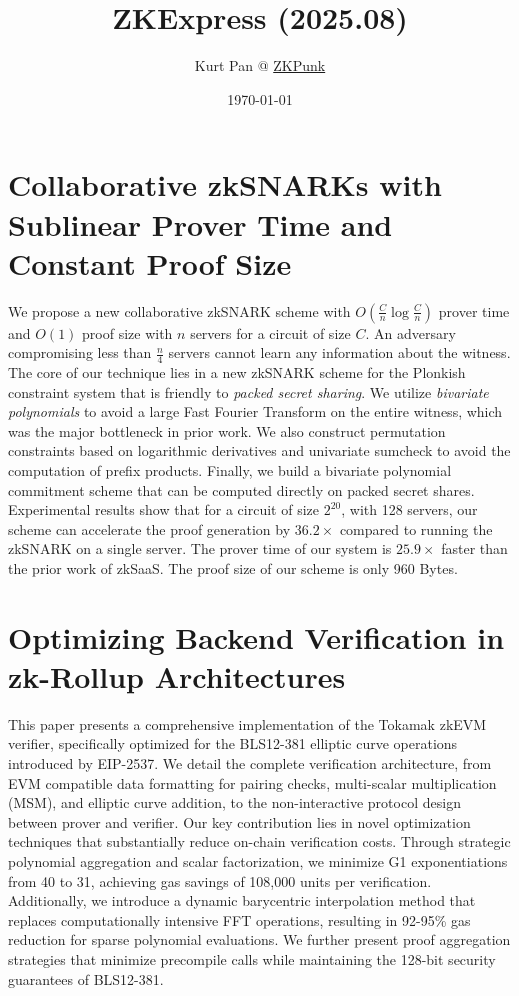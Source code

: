 \documentclass[11pt]{article}
\theoremstyle{definition}
\theoremstyle{remark}
\theoremstyle{plain}
\begin{document}
\title{ZKExpress (2025.08)}
\author{Kurt Pan @ \href{https://zkpunk.pro}{ZKPunk}}
\date{\today}
\maketitle
\tableofcontents

\section{\cite{cryptoeprint:2025/1388} Collaborative zkSNARKs with Sublinear Prover Time and Constant Proof Size}
We propose a new collaborative zkSNARK scheme with $O\left(\frac{C}{n} \log \frac{C}{n}\right)$ prover time and $O(1)$ proof size with $n$ servers for a circuit of size $C$. 
An adversary compromising less than $\frac{n}{4}$ servers cannot learn any information about the witness. 
The core of our technique lies in a new zkSNARK scheme for the Plonkish constraint system that is friendly to \emph{packed secret sharing}. We utilize \emph{bivariate polynomials} to avoid a large Fast Fourier Transform on the entire witness, which was the major bottleneck in prior work. We also construct permutation constraints based on logarithmic derivatives and univariate sumcheck to avoid the computation of prefix products. Finally, we build a bivariate polynomial commitment scheme that can be computed directly on packed secret shares.
Experimental results show that for a circuit of size $2^{20}$, with 128 servers, our scheme can accelerate the proof generation by $36.2 \times$ compared to running the zkSNARK on a single server. The prover time of our system is $25.9 \times$ faster than the prior work of zkSaaS. The proof size of our scheme is only 960 Bytes.

\section{\cite{cryptoeprint:2025/1390} Optimizing Backend Verification in zk-Rollup Architectures}
This paper presents a comprehensive implementation of the Tokamak zkEVM verifier, specifically optimized for the BLS12-381 elliptic curve operations introduced by EIP-2537. We detail the complete verification architecture, from EVM compatible data formatting for pairing checks, multi-scalar multiplication (MSM), and elliptic curve addition, to the non-interactive protocol design between prover and verifier.
Our key contribution lies in novel optimization techniques that substantially reduce on-chain verification costs. 
Through strategic polynomial aggregation and scalar factorization, we minimize G1 exponentiations from 40 to 31, achieving gas savings of 108,000 units per verification. 
Additionally, we introduce a dynamic barycentric interpolation method that replaces computationally intensive FFT operations,
resulting in 92-95\% gas reduction for sparse polynomial evaluations. We further present proof aggregation strategies that minimize precompile calls while maintaining the 128-bit security guarantees of BLS12-381.



\end{document}
